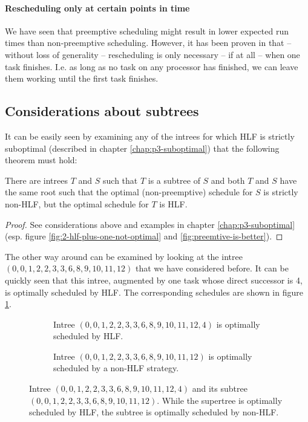 \paragraph{Rescheduling only at certain points in time}

We have seen that preemptive scheduling might result in lower expected run times than non-preemptive scheduling. However, it has been proven in \cite{chandyreynoldslargepaper1979} that -- without loss of generality -- rescheduling is only necessary -- if at all -- when one task finishes. I.e. as long as no task on any processor has finished, we can leave them working until the first task finishes.

\subsection{Considerations about subtrees}
\label{sec:properties-optimal-schedules-no-implications}

It can be easily seen by examining any of the intrees for which HLF is strictly suboptimal (described in chapter \ref{chap:p3-suboptimal}) that the following theorem must hold:

\begin{theorem}
  There are intrees $T$ and $S$ such that $T$ is a subtree of $S$ and both $T$ and $S$ have the same root such that the optimal (non-preemptive) schedule for $S$ is strictly non-HLF, but the optimal schedule for $T$ is HLF.
\end{theorem}

\begin{proof}
  See considerations above and examples in chapter \ref{chap:p3-suboptimal} (esp. figure \ref{fig:2-hlf-plus-one-not-optimal} and \ref{fig:preemtive-is-better}).
\end{proof}

The other way around can be examined by looking at the intree $(0,0,1,2,2,3,3,6,8,9,10,11,12)$ that we have considered before. It can be quickly seen that this intree, augmented by one task whose direct successor is 4, is optimally scheduled by HLF. The corresponding schedules are shown in figure \ref{fig:supertree-hls-subtree-non-hlf}.

\begin{figure}[th]
  \centering
  \begin{subfigure}{.45\textwidth}
    \centering
    
    \caption{Intree $(0,0,1,2,2,3,3,6,8,9,10,11,12,4)$ is optimally scheduled by HLF.}
  \end{subfigure}
  \quad
  \begin{subfigure}{.45\textwidth}
    \centering
    
    \caption{Intree $(0,0,1,2,2,3,3,6,8,9,10,11,12)$ is optimally scheduled by a non-HLF strategy.}
  \end{subfigure}
  \caption{Intree $(0,0,1,2,2,3,3,6,8,9,10,11,12,4)$ and its subtree $(0,0,1,2,2,3,3,6,8,9,10,11,12)$. While the supertree is optimally scheduled by HLF, the subtree is optimally scheduled by non-HLF.}
  \label{fig:supertree-hls-subtree-non-hlf}
\end{figure}

